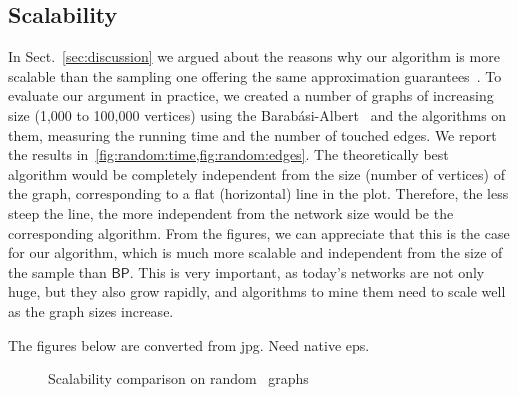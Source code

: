 \subsection{Scalability}\label{sec:scalability}
In Sect.~\ref{sec:discussion} we argued about the reasons why our algorithm is
more scalable than the sampling one offering the same approximation
guarantees~\citep{BrandesP07,GeisbergerSS08,JacobKLPT05}. To evaluate our
argument in practice, we created a number of graphs of increasing size (1,000 to
100,000 vertices) using the Barab\'asi-Albert~\citep{BarabasiA99} and the
algorithms on them, measuring the running time and the number of touched
edges. We report the results in~\cref{fig:random:time,fig:random:edges}. The
theoretically best algorithm would be completely independent from the size
(number of vertices) of the graph, corresponding to a flat (horizontal) line in
the plot. Therefore, the less steep the line, the more independent from the
network size would be the corresponding algorithm. From the figures, we can
appreciate that this is the case for our algorithm, which is much more scalable
and independent from the size of the sample than $\mathsf{BP}$. This is very
important, as today's networks are not only huge, but they also grow rapidly,
and algorithms to mine them need to scale well as the graph sizes increase.

\XXX The figures below are converted from jpg. Need native eps.

\begin{figure*}
  \centering
  \hfill
  \hfill
  \hfill
  \label{fig:random}
  \caption{Scalability comparison on random~\citep{BarabasiA99} graphs}
\end{figure*}

